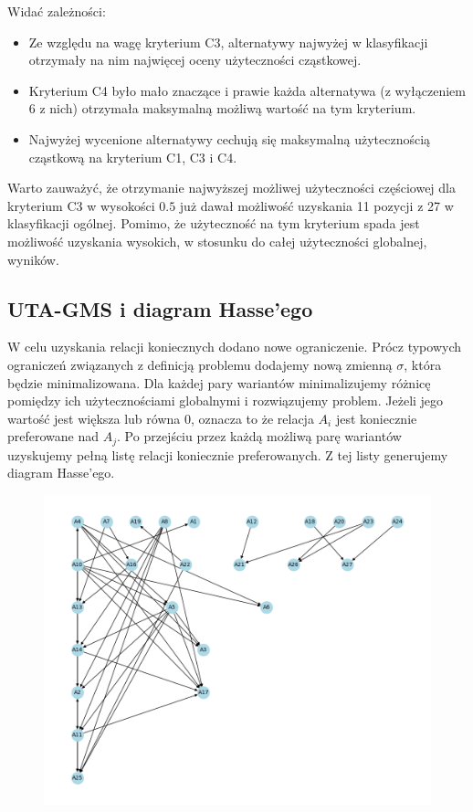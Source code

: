 \documentclass[11pt]{article}
\begin{document}
Widać zależności:
\begin{itemize}
\item Ze względu na wagę kryterium C3, alternatywy najwyżej w klasyfikacji otrzymały na nim najwięcej oceny użyteczności cząstkowej.
\item Kryterium C4 było mało znaczące i prawie każda alternatywa (z wyłączeniem 6 z nich) otrzymała maksymalną możliwą wartość na tym kryterium.
\item Najwyżej wycenione alternatywy cechują się maksymalną użytecznością cząstkową na kryterium C1, C3 i C4.
\end{itemize}

Warto zauważyć, że otrzymanie najwyższej możliwej użyteczności częściowej dla kryterium C3 w wysokości $0.5$ już dawał możliwość uzyskania 11 pozycji z 27 w klasyfikacji ogólnej. Pomimo, że użyteczność na tym kryterium spada jest możliwość uzyskania wysokich, w stosunku do całej użyteczności globalnej, wyników. 

\subsection{UTA-GMS i diagram Hasse'ego}
W celu uzyskania relacji koniecznych dodano nowe ograniczenie. Prócz typowych ograniczeń związanych z definicją problemu dodajemy nową zmienną $\sigma$, która będzie minimalizowana. Dla każdej pary wariantów minimalizujemy różnicę pomiędzy ich użytecznościami globalnymi i rozwiązujemy problem. Jeżeli jego wartość jest większa lub równa 0, oznacza to że relacja $A_i$ jest koniecznie preferowane nad $A_j$. Po przejściu przez każdą możliwą parę wariantów uzyskujemy pełną listę relacji koniecznie preferowanych. Z tej listy generujemy diagram Hasse'ego.
\begin{figure}[H]
	\centering
	\includegraphics[scale=0.6]{hasse.png}
\end{figure}
\end{document}
